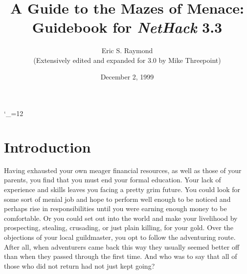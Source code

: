 
\textheight 220mm
\textwidth 160mm
\oddsidemargin 0mm
\evensidemargin 0mm
\topmargin 0mm

\newcommand{\nd}{\noindent}

\newcommand{\tb}[1]{\tt #1 \hfill}
\newcommand{\bb}[1]{\bf #1 \hfill}
\newcommand{\ib}[1]{\it #1 \hfill}

\newcommand{\blist}[1]
{\begin{list}{$\bullet$}
    {\leftmargin 30mm \topsep 2mm \partopsep 0mm \parsep 0mm \itemsep 1mm
     \labelwidth 28mm \labelsep 2mm
     #1}}

\newcommand{\elist}{\end{list}}

\catcode`\_=12


%
%

\title{\LARGE A Guide to the Mazes of Menace:\\
\Large Guidebook for {\it NetHack\/} 3.3}

\author{Eric S. Raymond\\
(Extensively edited and expanded for 3.0 by Mike Threepoint)}
\date{December 2, 1999}

\maketitle

\section{Introduction}


Having exhausted your own meager financial resources, as well as those of
your parents, you find that you must end your formal education.  Your lack of
experience and skills leaves you facing a pretty grim future.  You could look
for some sort of menial job and hope to perform well enough to be noticed and
perhaps rise in responsibilities until you were earning enough money to be
comfortable.  Or you could set out into the world and make your livelihood by
prospecting, stealing, crusading, or just plain killing, for your gold.
Over the objections of your local guildmaster, you opt to follow the
adventuring route.  After all, when adventurers came back this way they
usually seemed better off than when they passed through the first time.  And
who was to say that all of those who did not return had not just kept going?

